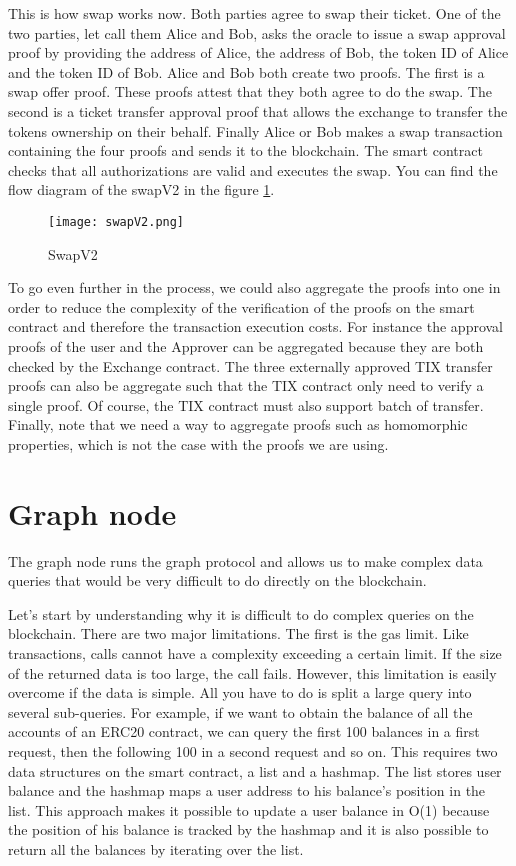\documentclass[a4paper,11pt,oneside]{report}
\begin{document}
This is how swap works now. Both parties agree to swap their ticket. One of the two parties, let call them Alice and Bob, asks the oracle to issue a swap approval proof by providing the address of Alice, the address of Bob, the token ID of Alice and the token ID of Bob. Alice and Bob both create two proofs. The first is a swap offer proof. These proofs attest that they both agree to do the swap. The second is a ticket transfer approval proof that allows the exchange to transfer the tokens ownership on their behalf. Finally Alice or Bob makes a swap transaction containing the four proofs and sends it to the blockchain. The smart contract checks that all authorizations are valid and executes the swap. You can find the flow diagram of the swapV2 in the figure \hyperref[fig:swapV2]{ \ref{fig:swapV2}}.

\begin{figure}[h!] 
  \centering
  \texttt{[image: swapV2.png]}
  \caption{SwapV2}
  \label{fig:swapV2}
\end{figure}

To go even further in the process, we could also aggregate the proofs into one in order to reduce the complexity of the verification of the proofs on the smart contract and therefore the transaction execution costs. For instance the approval proofs of the user and the Approver can be aggregated because they are both checked by the Exchange contract. The three externally approved TIX transfer proofs can also be aggregate such that the TIX contract only need to verify a single proof. Of course, the TIX contract must also support batch of transfer. Finally, note that we need a way to aggregate proofs such as homomorphic properties, which is not the case with the proofs we are using.

\section{Graph node}
The graph node runs the graph protocol and allows us to make complex data queries that would be very difficult to do directly on the blockchain.

Let's start by understanding why it is difficult to do complex queries on the blockchain. There are two major limitations. The first is the gas limit. Like transactions, calls cannot have a complexity exceeding a certain limit. If the size of the returned data is too large, the call fails. However, this limitation is easily overcome if the data is simple. All you have to do is split a large query into several sub-queries. For example, if we want to obtain the balance of all the accounts of an ERC20 contract, we can query the first 100 balances in a first request, then the following 100 in a second request and so on. This requires two data structures on the smart contract, a list and a hashmap. The list stores user balance and the hashmap maps a user address to his balance's position in the list. This approach makes it possible to update a user balance in O(1) because the position of his balance is tracked by the hashmap and it is also possible to return all the balances by iterating over the list.
\end{document}
